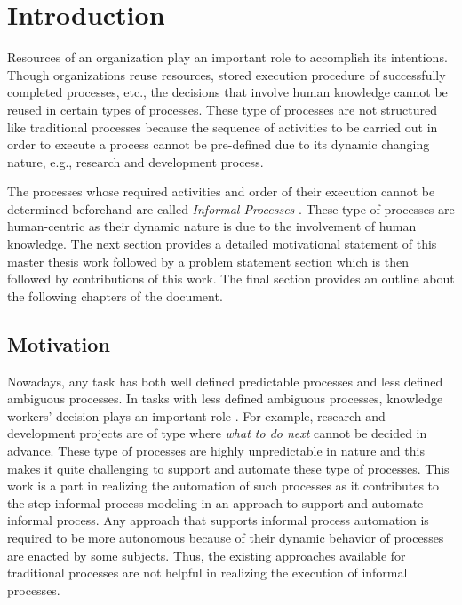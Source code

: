 \chapter{Introduction}
\label{chap:introduction}

Resources of an organization play an important role to accomplish its intentions. Though organizations reuse resources, stored execution procedure of successfully completed processes, etc., the decisions that involve human knowledge cannot be reused in certain types of processes. These type of processes are not structured like traditional processes because the sequence of activities to be carried out in order to execute a process cannot be pre-defined due to its dynamic changing nature, e.g., research and development process.

The processes whose required activities and order of their execution cannot be determined beforehand are called \textit{Informal Processes} \cite{Sungur2014}. These type of processes are human-centric as their dynamic nature is due to the involvement of human knowledge. The next section provides a detailed motivational statement of this master thesis work followed by a problem statement section which is then followed by contributions of this work. The final section provides an outline about the following chapters of the document. 

\section{Motivation}
\label{sec:motivation}
Nowadays, any task has both well defined predictable processes and less defined ambiguous processes. In tasks with less defined ambiguous processes, knowledge workers' decision plays an important role \cite{BPTrends2009}. For example, research and development projects are of type where \textit{what to do next} cannot be decided in advance. These type of processes are highly unpredictable in nature and this makes it quite challenging to support and automate these type of processes. This work is a part in realizing the automation of such processes as it contributes to the step informal process modeling in an approach to support and automate informal process. Any approach that supports informal process automation is required to be more autonomous because of their dynamic behavior of processes are enacted by some subjects. Thus, the existing approaches available for traditional processes are not helpful in realizing the execution of informal processes.  

